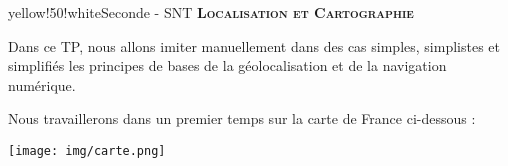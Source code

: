 
\usepackage{tkz-tab}

\usepackage{layout}

\pagestyle{fancy}
\renewcommand{\headrulewidth}{0pt}
\renewcommand{\footrulewidth}{1pt}
\cfoot{}
\rfoot{\thepage/\pageref{LastPage}}


	
	
	\begin{titre}{yellow!50!white}{Seconde - SNT}
		\centering
		{\Large \textsc{\textbf{Localisation et Cartographie}}}
	\end{titre}

	

		Dans ce TP, nous allons imiter manuellement dans des cas simples, simplistes et simplifiés les principes de bases de la géolocalisation et de la navigation numérique.
		\bigskip
		
		Nous travaillerons dans un premier temps sur la carte de France ci-dessous :\bigskip
		
		
		\texttt{[image: img/carte.png]}
	
